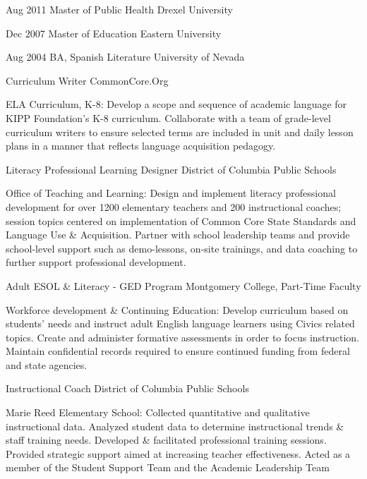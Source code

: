 \documentclass[]{scrartcl}
\begin{document}
\begin{cleanCV}
\WorkExperience
{Aug 2011}
{Master of Public Health}
{Drexel University}

\WorkExperience
{Dec 2007}
{Master of Education}
{Eastern University}

\WorkExperience
{Aug 2004}
{BA, Spanish Literature}
{University of Nevada}


{Curriculum Writer}
{CommonCore.Org}

\JobDesc
{ELA Curriculum, K-8: }
{Develop a scope and sequence of academic language for KIPP Foundation's K-8 curriculum. Collaborate with a team of grade-level curriculum writers to ensure selected terms are included in unit and daily lesson plans in a manner that reflects language acquisition pedagogy.}

{Literacy Professional Learning Designer}
{District of Columbia Public Schools}

\JobDesc
{Office of Teaching and Learning: }
{Design and implement literacy professional development for over 1200 elementary teachers and 200 instructional coaches; session topics centered on implementation of Common Core State Standards and Language Use \& Acquisition. Partner with school leadership teams and provide school-level support such as demo-lessons, on-site trainings, and data coaching to further support professional development.}

{Adult ESOL \& Literacy - GED Program}
{Montgomery College, Part-Time Faculty}

\JobDesc
{Workforce development \& Continuing Education: }
{Develop curriculum based on students' needs and instruct adult English language learners using Civics related topics. Create and administer formative assessments in order to focus instruction. Maintain confidential records required to ensure continued funding from federal and state agencies.}

{Instructional Coach}
{District of Columbia Public Schools}

\JobDesc
{Marie Reed Elementary School: }
{Collected quantitative and qualitative instructional data. Analyzed student data to determine instructional trends \& staff training needs. Developed \& facilitated professional training sessions. Provided strategic support aimed at increasing teacher effectiveness. Acted as a member of the  Student Support Team and the Academic Leadership Team}


\end{cleanCV}
\end{document}
